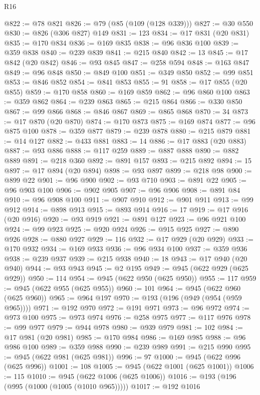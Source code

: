 \begin{lexlean}{R16}
\begin{coremodule}
@822 := @78 @821
@826 := @79 (@85 (@109 (@128 @339)))
@827 := @30 @550
@830 := @826 (@306 @827) @149
@831 := 123
@834 := @17 @831 (@20 @831)
@835 := @170 @834
@836 := @169 @835
@838 := @96 @836 @100
@839 := @359 @838
@840 := @239 @839
@841 := @215 @840
@842 := 13
@845 := @17 @842 (@20 @842)
@846 := @93 @845
@847 := @258 @594
@848 := @163 @847
@849 := @96 @848
@850 := @849 @100
@851 := @349 @850
@852 := @99 @851
@853 := @846 @852
@854 := @841 @853
@855 := 91
@858 := @17 @855 (@20 @855)
@859 := @170 @858
@860 := @169 @859
@862 := @96 @860 @100
@863 := @359 @862
@864 := @239 @863
@865 := @215 @864
@866 := @330 @850
@867 := @99 @866
@868 := @846 @867
@869 := @865 @868
@870 := 34
@873 := @17 @870 (@20 @870)
@874 := @170 @873
@875 := @169 @874
@877 := @96 @875 @100
@878 := @359 @877
@879 := @239 @878
@880 := @215 @879
@881 := @14 @127
@882 := @433 @881
@883 := 14
@886 := @17 @883 (@20 @883)
@887 := @93 @886
@888 := @117 @259
@889 := @887 @888
@890 := @882 @889
@891 := @218 @360
@892 := @891 @157
@893 := @215 @892
@894 := 15
@897 := @17 @894 (@20 @894)
@898 := @93 @897
@899 := @218 @98
@900 := @899 @22
@901 := @96 @900
@902 := @93 @710
@903 := @891 @22
@905 := @96 @903 @100
@906 := @902 @905
@907 := @96 @906
@908 := @891 @84
@910 := @96 @908 @100
@911 := @907 @910
@912 := @901 @911
@913 := @99 @912
@914 := @898 @913
@915 := @893 @914
@916 := 17
@919 := @17 @916 (@20 @916)
@920 := @93 @919
@921 := @891 @127
@923 := @96 @921 @100
@924 := @99 @923
@925 := @920 @924
@926 := @915 @925
@927 := @890 @926
@928 := @880 @927
@929 := 116
@932 := @17 @929 (@20 @929)
@933 := @170 @932
@934 := @169 @933
@936 := @96 @934 @100
@937 := @359 @936
@938 := @239 @937
@939 := @215 @938
@940 := 18
@943 := @17 @940 (@20 @940)
@944 := @93 @943
@945 := @2 @195
@949 := @945 (@622 @929 (@625 @929))
@950 := 114
@954 := @945 (@622 @950 (@625 @950))
@955 := 117
@959 := @945 (@622 @955 (@625 @955))
@960 := 101
@964 := @945 (@622 @960 (@625 @960))
@965 := @964 @197
@970 := @193 (@196 (@949 (@954 (@959 @965))))
@971 := @192 @970
@972 := @191 @971
@973 := @96 @972
@974 := @973 @100
@975 := @973 @974
@976 := @258 @975
@977 := @117 @976
@978 := @99 @977
@979 := @944 @978
@980 := @939 @979
@981 := 102
@984 := @17 @981 (@20 @981)
@985 := @170 @984
@986 := @169 @985
@988 := @96 @986 @100
@989 := @359 @988
@990 := @239 @989
@991 := @215 @990
@995 := @945 (@622 @981 (@625 @981))
@996 := 97
@1000 := @945 (@622 @996 (@625 @996))
@1001 := 108
@1005 := @945 (@622 @1001 (@625 @1001))
@1006 := 115
@1010 := @945 (@622 @1006 (@625 @1006))
@1016 := @193 (@196 (@995 (@1000 (@1005 (@1010 @965)))))
@1017 := @192 @1016

\end{coremodule}
\end{lexlean}
